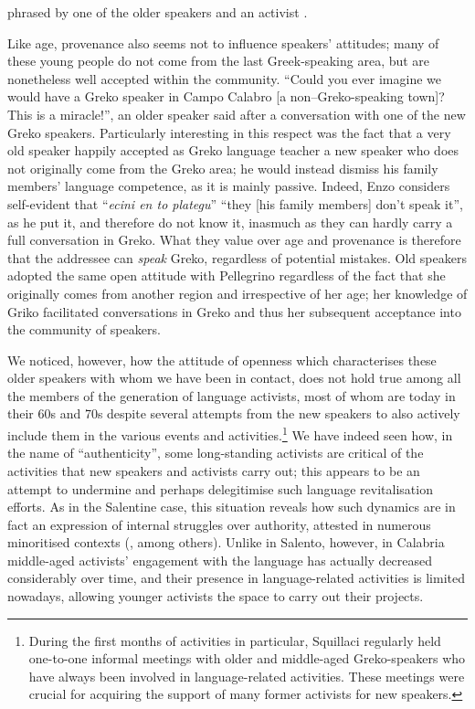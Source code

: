 \documentclass[output=paper,hidelinks]{langscibook}
\begin{document}
phrased by one of the older speakers and an activist \citep{Squillaci-inprep}. 



Like age, provenance also seems not to influence speakers’ attitudes; many of these young people do not come from the last Greek-speaking area, but are nonetheless well accepted within the community. ``Could you ever imagine we would have a Greko speaker in Campo Calabro [a non–Greko-speaking town]? This is a miracle!'', an older speaker said after a conversation with one of the new Greko speakers. Particularly interesting in this respect was the fact that a very old speaker happily accepted as Greko language teacher a new speaker who does not originally come from the Greko area; he would instead dismiss his family members’ language competence, as it is mainly passive. Indeed, Enzo considers self-evident that ``\textit{ecini en to plategu}'' ``they [his family members] don’t speak it'', as he put it, and therefore do not know it, inasmuch as they can hardly carry a full conversation in Greko. What they value over age and provenance is therefore that the addressee can \textit{speak} Greko, regardless of potential mistakes. Old speakers adopted the same open attitude with Pellegrino regardless of the fact that she originally comes from another region and irrespective of her age; her knowledge of Griko facilitated conversations in Greko and thus her subsequent acceptance into the community of speakers. 



We noticed, however, how the attitude of openness which characterises these older speakers with whom we have been in contact, does not hold true among all the members of the generation of language activists, most of whom are today in their 60s and 70s despite several attempts from the new speakers to also actively include them in the various events and activities.\footnote{During the first months of activities in particular, Squillaci regularly held one-to-one informal meetings with older and middle-aged Greko-speakers who have always been involved in language-related activities. These meetings were crucial for acquiring the support of many former activists for new speakers.} We have indeed seen how, in the name of ``authenticity'', some long-standing activists are critical of the activities that new speakers and activists carry out; this appears to be an attempt to undermine and perhaps delegitimise such language revitalisation efforts. As in the Salentine case, this situation reveals how such dynamics are in fact an expression of internal struggles over authority, attested in numerous minoritised contexts (\citealt{RourkeRamallo2013, Costa2015, Sallabank2017, SallabankMarquis2018}, among others). Unlike in Salento, however, in Calabria middle-aged activists’ engagement with the language has actually decreased considerably over time, and their presence in language-related activities is limited nowadays, allowing younger activists the space to carry out their projects.
\end{document}
